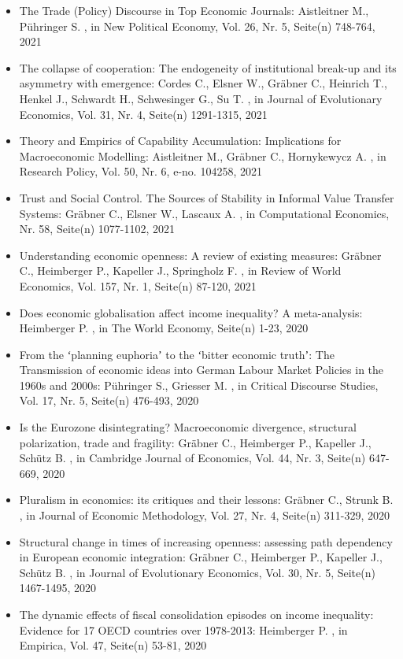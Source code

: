 \begin{itemize}
\item The Trade (Policy) Discourse in Top Economic Journals: Aistleitner M., Pühringer S. , in New Political Economy, Vol. 26, Nr. 5, Seite(n) 748-764, 2021
\item The collapse of cooperation: The endogeneity of institutional break-up and its asymmetry with emergence: Cordes C., Elsner W., Gräbner C., Heinrich T., Henkel J., Schwardt H., Schwesinger G., Su T. , in Journal of Evolutionary Economics, Vol. 31, Nr. 4, Seite(n) 1291-1315, 2021
\item Theory and Empirics of Capability Accumulation: Implications for Macroeconomic Modelling: Aistleitner M., Gräbner C., Hornykewycz A. , in Research Policy, Vol. 50, Nr. 6, e-no. 104258, 2021
\item Trust and Social Control. The Sources of Stability in Informal Value Transfer Systems: Gräbner C., Elsner W., Lascaux A. , in Computational Economics, Nr. 58, Seite(n) 1077-1102, 2021
\item Understanding economic openness: A review of existing measures: Gräbner C., Heimberger P., Kapeller J., Springholz F. , in Review of World Economics, Vol. 157, Nr. 1, Seite(n) 87-120, 2021
\item Does economic globalisation affect income inequality? A meta-analysis: Heimberger P. , in The World Economy, Seite(n) 1-23, 2020
\item From the ʻplanning euphoriaʼ to the ʻbitter economic truthʼ: The Transmission of economic ideas into German Labour Market Policies in the 1960s and 2000s: Pühringer S., Griesser M. , in Critical Discourse Studies, Vol. 17, Nr. 5, Seite(n) 476-493, 2020
\item Is the Eurozone disintegrating? Macroeconomic divergence, structural polarization, trade and fragility: Gräbner C., Heimberger P., Kapeller J., Schütz B. , in Cambridge Journal of Economics, Vol. 44, Nr. 3, Seite(n) 647-669, 2020
\item Pluralism in economics: its critiques and their lessons: Gräbner C., Strunk B. , in Journal of Economic Methodology, Vol. 27, Nr. 4, Seite(n) 311-329, 2020
\item Structural change in times of increasing openness: assessing path dependency in European economic integration: Gräbner C., Heimberger P., Kapeller J., Schütz B. , in Journal of Evolutionary Economics, Vol. 30, Nr. 5, Seite(n) 1467-1495, 2020
\item The dynamic effects of fiscal consolidation episodes on income inequality: Evidence for 17 OECD countries over 1978-2013: Heimberger P. , in Empirica, Vol. 47, Seite(n) 53-81, 2020

\end{itemize}
